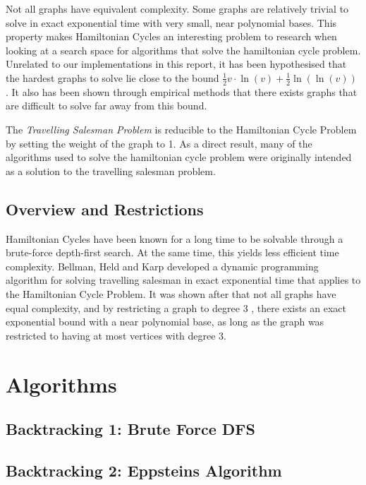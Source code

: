 Not all graphs have equivalent complexity. Some graphs are relatively trivial to
solve in exact exponential time with very small, near polynomial bases. This
property makes Hamiltonian Cycles an interesting problem to research when
looking at a search space for algorithms that solve the hamiltonian cycle
problem. Unrelated to our implementations in this report, it has been
hypothesised that the hardest graphs to solve lie close to the bound
$\frac{1}{2} v \cdot \ln(v)+\frac{1}{2} \ln(\ln(v))$ \cite{Szem2006}. It also
has been shown through empirical methods \cite{Berg2021} that there exists
graphs that are difficult to solve far away from this bound. 

The \emph{Travelling Salesman Problem} is reducible to the Hamiltonian Cycle
Problem by setting the weight of the graph to 1. As a direct result, many of the
algorithms used to solve the hamiltonian cycle problem were originally intended
as a solution to the travelling salesman problem.

\subsection{Overview and Restrictions}

Hamiltonian Cycles have been known for a long time to be solvable through a
brute-force depth-first search. At the same time, this yields less efficient
time complexity. Bellman\cite{Bell1962}, Held and Karp\cite{Karp1962} developed
a dynamic programming algorithm for solving travelling salesman in exact
exponential time that applies to the Hamiltonian Cycle Problem. It was shown
after that not all graphs have equal complexity, and by restricting a graph to
degree 3 \cite{Epps2007}, there exists an exact exponential bound with a near
polynomial base, as long as the graph was restricted to having at most vertices
with degree 3.

\newpage

\section{Algorithms}

\subsection{Backtracking 1: Brute Force DFS}

\subsection{Backtracking 2: Eppsteins Algorithm}

\printbibliography

